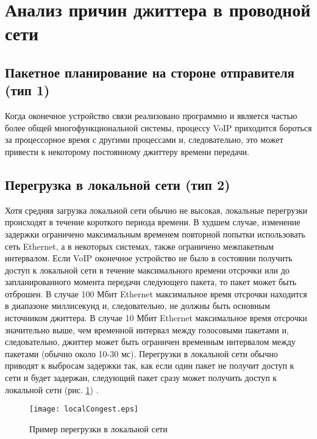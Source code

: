 \section{Анализ причин джиттера в проводной сети} \label{sect2_1}

\subsection{Пакетное планирование на стороне отправителя (тип 1)} \label{subsect2_1_1}
Когда оконечное устройство связи реализовано программно и является частью более общей многофункциональной системы, процессу VoIP приходится бороться за процессорное время с другими процессами и, следовательно, это может привести к некоторому постоянному джиттеру времени передачи.

\subsection{Перегрузка в локальной сети (тип 2)} \label{subsect2_1_2}
Хотя средняя загрузка локальной сети обычно не высокая, локальные перегрузки происходят в течение короткого периода времени. В худшем случае, изменение задержки ограничено максимальным временем повторной попытки использовать сеть Ethernet, а в некоторых системах, также ограничено межпакетным интервалом.
Если VoIP оконечное устройство не было в состоянии получить доступ к локальной сети в течение максимального времени отсрочки или до запланированного момента передачи следующего пакета, то пакет может быть отброшен. В случае 100 Мбит Ethernet максимальное время отсрочки находится в диапазоне миллисекунд и, следовательно, не должны быть основным источником джиттера. В случае 10 Мбит Ethernet максимальное время отсрочки значительно выше, чем временной интервал между голосовыми пакетами и, следовательно, джиттер может быть ограничен временным интервалом между пакетами (обычно около 10-30 мс).
Перегрузки в локальной сети обычно приводят к выбросам задержки так, как если один пакет не получит доступ к сети и будет задержан, 
следующий пакет сразу может получить доступ к локальной сети (рис. \ref{img:localCongest}) \cite{clark}.

\begin{figure} [!h]
  \center
\texttt{[image: localCongest.eps]}
  \caption{Пример перегрузки в локальной сети}
  \label{img:localCongest}
\end{figure}

